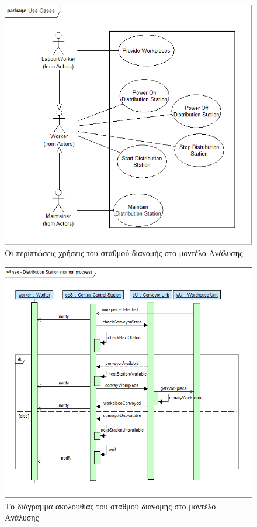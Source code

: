 \documentclass[a4paper,12pt,twoside]{report}
\begin{document}
{\begin{appendices}
			\begin{figure}[hp]
					\centering
					\includegraphics[scale=0.30]{AnalysisModel_uc-DistributionStationsUseCases.png}
					\caption{Οι περιπτώσεις χρήσεις του σταθμού διανομής στο μοντέλο Ανάλυσης}
					\label{φωτ:Οι περιπτώσεις χρήσεις του σταθμού διανομής στο μοντέλο Ανάλυσης}
			\end{figure}
			
			\begin{figure}[hp]
					\centering
					\includegraphics[scale=0.30]{AnalysisModel_seq-DistributionStation(normalprocess).png}
					\caption{Το διάγραμμα ακολουθίας του σταθμού διανομής στο μοντέλο Ανάλυσης}
					\label{φωτ:Το διάγραμμα ακολουθίας του σταθμού διανομής στο μοντέλο Ανάλυσης}
			\end{figure}


\end{appendices}}
\end{document}
